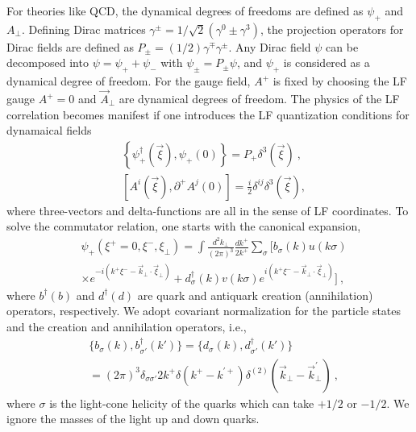 \documentclass[twocolumn,superscriptaddress,longbibliography,10pt]{revtex4-1}
\begin{document}
For theories like QCD, the dynamical degrees of freedoms
are defined as $\psi_+$ and $A_\perp$. Defining Dirac matrices
$\gamma^\pm = 1/\sqrt{2}(\gamma^0\pm\gamma^3)$, the
projection operators for Dirac fields are defined
as $P_\pm = (1/2)\gamma^\mp\gamma^\pm$. Any Dirac field $\psi$
can be decomposed into $\psi=\psi_++\psi_-$ with
$\psi_\pm = P_\pm \psi$, and $\psi_+$ is considered as a dynamical degree of freedom. For the gauge field, $A^+$ is fixed by choosing the LF gauge
$A^+=0$ and $\vec{A}_\perp$ are dynamical degrees of freedom. The physics of the LF correlation becomes manifest if one introduces the LF quantization conditions for dynamaical fields
\begin{eqnarray}
& \left\{\psi_+^\dagger(\vec{\xi}),\psi_+(0)\right\} = P_+\delta^3(\vec{\xi}) \ , \\
& \left[A^i(\vec{\xi}), \partial^+A^j(0)\right]=\frac{i}{2}\delta^{ij}\delta^3(\vec{\xi}) ,
\end{eqnarray}
where three-vectors and delta-functions are all in the sense of LF
coordinates. To solve the commutator relation, one starts with the canonical expansion,
\begin{align}\label{eq:LFquark}
  & \psi_+(\xi^+=0,\xi^-,\xi_\perp)
  = \int \frac{d^2k_\perp}{ (2\pi)^3}
    \frac{dk^+}{ 2k^+}\sum_\sigma \Big[ b_\sigma(k) u(k\sigma)
     \nonumber \\
 &  \times e^{-i(k^+\xi^--\vec{k}_\perp\cdot\vec{\xi}_\perp)}
  + d_\sigma^\dagger(k) v(k\sigma)e^{i(k^+\xi^--\vec{k}_\perp\cdot\vec{\xi}_\perp)}
 \Big]
  \ ,
\end{align}
where $b^\dagger(b)$ and $d^\dagger(d)$ are quark and antiquark creation (annihilation)
operators, respectively. We adopt covariant normalization for the particle
states and the creation and annihilation operators, i.e.,
\begin{eqnarray}
& \big\{b_\sigma(k),b_{\sigma'}^\dagger(k')\big\}=
\big\{d_\sigma(k),d_{\sigma'}^\dagger(k')\big\} \nonumber \\
& =(2\pi)^3\delta_{\sigma\sigma'}2k^+\delta(k^+-k^{'+})
\delta^{(2)}(\vec{k}_\perp-\vec{k}_\perp^\prime)\ ,
\end{eqnarray}
where $\sigma$ is the light-cone
helicity of the quarks which can take $+1/2$ or $-1/2$. We ignore
the masses of the light up and down quarks.
\end{document}
